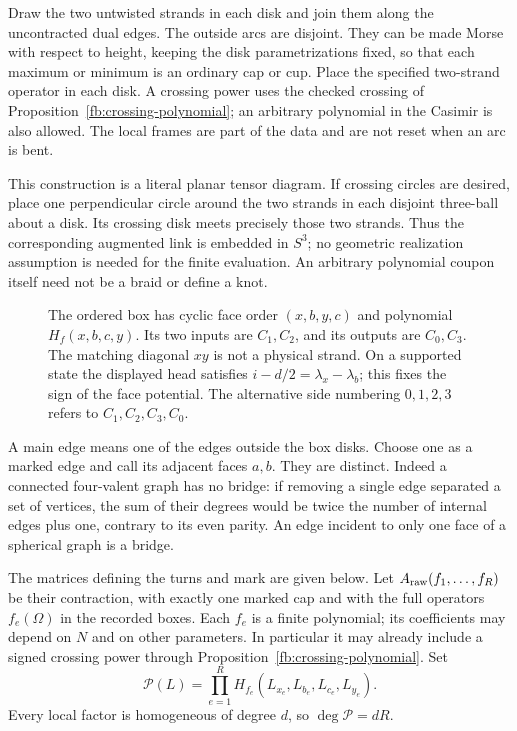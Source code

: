 Draw the two untwisted strands in each disk and join them along the
uncontracted dual edges. The outside arcs are disjoint. They can be
made Morse with respect to height, keeping the disk parametrizations
fixed, so that each maximum or minimum is an ordinary cap or cup.
Place the specified two-strand operator in each disk. A crossing
power uses the checked crossing of Proposition~\ref{fb:crossing-polynomial};
an arbitrary polynomial in the Casimir is also allowed. The local
frames are part of the data and are not reset when an arc is bent.

This construction is a literal planar tensor diagram. If crossing
circles are desired, place one perpendicular circle around the two
strands in each disjoint three-ball about a disk. Its crossing disk
meets precisely those two strands. Thus the corresponding augmented
link is embedded in \(S^3\); no geometric realization assumption is
needed for the finite evaluation. An arbitrary polynomial coupon
itself need not be a braid or define a knot.

\begin{figure}[ht]
 \centering
 
 \caption{The ordered box has cyclic face order \((x,b,y,c)\) and
 polynomial \(H_f(x,b,c,y)\). Its two inputs are \(C_1,C_2\), and
 its outputs are \(C_0,C_3\). The matching diagonal \(xy\) is not a
 physical strand. On a supported state the displayed head satisfies
 \(i-d/2=\lambda_x-\lambda_b\); this fixes the sign of the face
 potential. The alternative side numbering \(0,1,2,3\) refers to
 \(C_1,C_2,C_3,C_0\).}
 \label{de:figure}
\end{figure}

A main edge means one of the edges outside the box disks. Choose one
as a marked edge and call its adjacent faces \(a,b\). They are
distinct. Indeed a connected four-valent graph has no bridge:
if removing a single edge separated a set of vertices, the sum of
their degrees would be twice the number of internal edges plus one,
contrary to its even parity. An edge incident to only one face of
a spherical graph is a bridge.

The matrices defining the turns and mark are given below. Let
\(A_{\rm raw}(f_1,\ldots,f_R)\) be their contraction, with exactly
one marked cap and with the full operators \(f_e(\Omega)\) in the
recorded boxes. Each \(f_e\) is a finite polynomial; its coefficients
may depend on \(N\) and on other parameters. In particular it may
already include a signed crossing power through
Proposition~\ref{fb:crossing-polynomial}. Set
\[
 \mathcal P(L)=\prod_{e=1}^R
 H_{f_e}(L_{x_e},L_{b_e},L_{c_e},L_{y_e}).
\]
Every local factor is homogeneous of degree \(d\), so
\(\deg\mathcal P=dR\).

